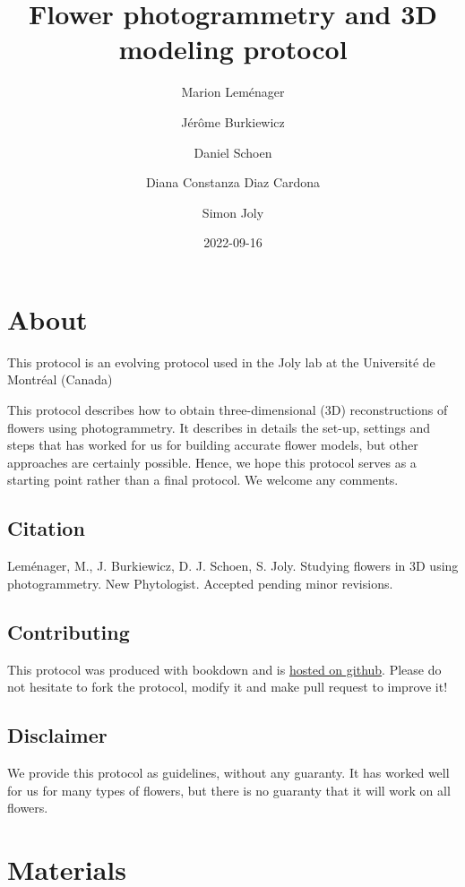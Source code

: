 \documentclass[
]{book}
\title{Flower photogrammetry and 3D modeling protocol}
\author{Marion Leménager \and Jérôme Burkiewicz \and Daniel Schoen \and Diana Constanza Diaz Cardona \and Simon Joly}
\date{2022-09-16}
\theoremstyle{definition}
\theoremstyle{definition}
\theoremstyle{definition}
\theoremstyle{definition}
\theoremstyle{remark}
\begin{document}
\maketitle

{
\setcounter{tocdepth}{1}
\tableofcontents
}
\hypertarget{about}{%
\chapter{About}\label{about}}

This protocol is an evolving protocol used in the Joly lab at the Université de Montréal (Canada)

This protocol describes how to obtain three-dimensional (3D) reconstructions of flowers using photogrammetry. It describes in details the set-up, settings and steps that has worked for us for building accurate flower models, but other approaches are certainly possible. Hence, we hope this protocol serves as a starting point rather than a final protocol. We welcome any comments.

\hypertarget{citation}{%
\section{Citation}\label{citation}}

Leménager, M., J. Burkiewicz, D. J. Schoen, S. Joly. Studying flowers in 3D using photogrammetry. New Phytologist. Accepted pending minor revisions.

\hypertarget{contributing}{%
\section{Contributing}\label{contributing}}

This protocol was produced with bookdown and is \href{https://github.com/plantevolution/photogrammetry-protocol}{hosted on github}. Please do not hesitate to fork the protocol, modify it and make pull request to improve it!

\hypertarget{disclaimer}{%
\section{Disclaimer}\label{disclaimer}}

We provide this protocol as guidelines, without any guaranty. It has worked well for us for many types of flowers, but there is no guaranty that it will work on all flowers.

\hypertarget{materials}{%
\chapter{Materials}\label{materials}}
\end{document}
